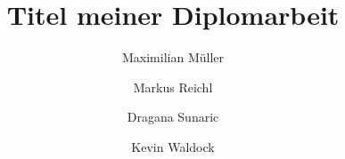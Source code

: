 \documentclass[minted]{thesis}
\title{Titel meiner Diplomarbeit}
\author{Maximilian Müller \and Markus Reichl \and Dragana Sunaric \and Kevin Waldock}
\begin{document}

\tableofcontents\glsresetall

\mainmatter










\end{document}
